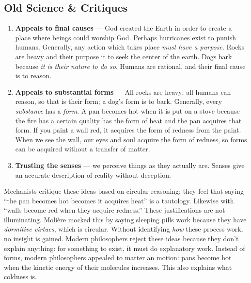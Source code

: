 \subsection*{Old Science \textsc{\&} Critiques}
\begin{enumerate}
\item \textbf{Appeals to final causes} --- God created the Earth in order to create a place where beings could worship God. Perhaps hurricanes exist to punish humans. Generally, any action which takes place \emph{must have a purpose}. Rocks are heavy and their purpose it to seek the center of the earth. Dogs bark because \emph{it is their nature to do so}. Humans are rational, and their final cause is to reason.

\item \textbf{Appeals to substantial forms} --- All rocks are heavy; all humans can reason, so that is their form; a dog's form is to bark. Generally, every \emph{substance} has a \emph{form}. A pan becomes hot when it is put on a stove because the fire has a certain quality has the form of heat and the pan acquires that form. If you paint a wall red, it acquires the form of redness from the paint. When we see the wall, our eyes and soul acquire the form of redness, so forms can be acquired without a transfer of matter.

\item \textbf{Trusting the senses} --- we perceive things as they actually are. Senses give an accurate description of reality without deception.
\end{enumerate}

Mechanists critique these ideas based on circular reasoning; they feel that saying ``the pan becomes hot becomes it acquires heat'' is a tautology. Likewise with ``walls become red when they acquire redness.'' These justifications are not illuminating. Molière mocked this by saying sleeping pills work because they have \emph{dormitive virtues}, which is circular. Without identifying \emph{how} these process work, no insight is gained. Modern philosophers reject these ideas because they don't explain anything: for something to exist, it must do explanatory work. Instead of forms, modern philosophers appealed to matter an motion: pans become hot when the kinetic energy of their molecules increases. This also explains what coldness is.

